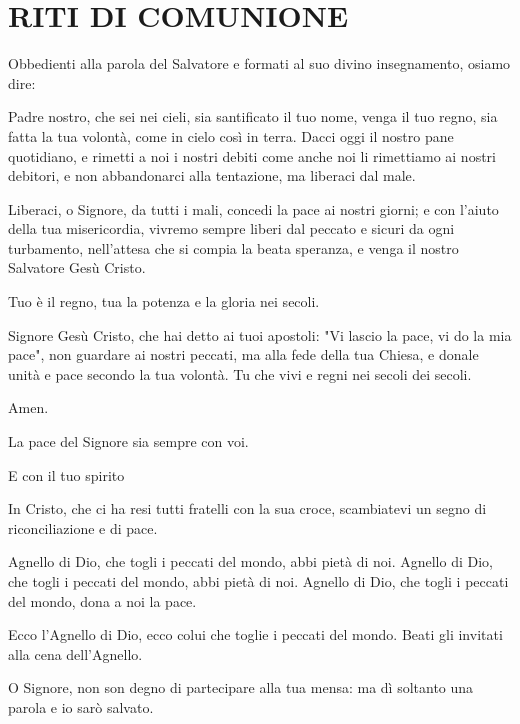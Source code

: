 

\section*{RITI DI COMUNIONE}

\begin{dialoghi}
\item[\sacerdote] Obbedienti alla parola del Salvatore e formati al suo divino insegnamento, osiamo dire:
\item[\assemblea] Padre nostro, che sei nei cieli, sia santificato il tuo nome, venga il tuo regno, sia fatta la tua volontà, come in cielo così in terra. Dacci oggi il nostro pane quotidiano, e rimetti a noi i nostri debiti come anche noi li rimettiamo ai nostri debitori, e non abbandonarci alla tentazione, ma liberaci dal male.
\item[\sacerdote] Liberaci, o Signore, da tutti i mali, concedi la pace ai nostri giorni; e con l'aiuto della tua misericordia, vivremo sempre liberi dal peccato e sicuri da ogni turbamento, nell'attesa che si compia la beata speranza, e venga il nostro Salvatore Gesù Cristo.
\item[\assemblea] Tuo è il regno, tua la potenza e la gloria nei secoli.
\item[\sacerdote] Signore Gesù Cristo, che hai detto ai tuoi apostoli: "Vi lascio la pace, vi do la mia pace", non guardare ai nostri peccati, ma alla fede della tua Chiesa, e donale unità e pace secondo la tua volontà. Tu che vivi e regni nei secoli dei secoli.
\item[\assemblea] Amen.
\item[\sacerdote] La pace del Signore sia sempre con voi.
\item[\assemblea] E con il tuo spirito
\item[\sacerdote] In Cristo, che ci ha resi tutti fratelli con la sua croce, scambiatevi un segno di riconciliazione e di pace.

\item[\assemblea] Agnello di Dio, che togli i peccati del mondo, abbi pietà di noi. Agnello di Dio, che togli i peccati del mondo, abbi pietà di noi. Agnello di Dio, che togli i peccati del mondo, dona a noi la pace.
\item[\sacerdote] Ecco l'Agnello di Dio, ecco colui che toglie i peccati del mondo. Beati gli invitati alla cena dell'Agnello.
\item[\assemblea] O Signore, non son degno di partecipare alla tua mensa: ma dì soltanto una parola e io sarò salvato.
\end{dialoghi}

